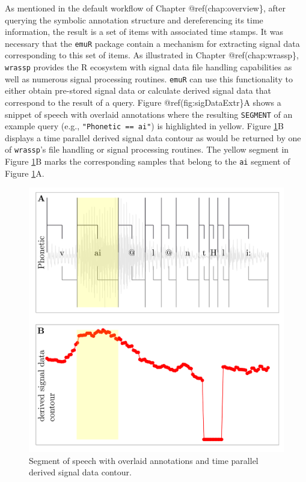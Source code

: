 \documentclass[]{book}
\begin{document}
As mentioned in the default workflow of Chapter @ref(chap:overview\}, after querying the symbolic annotation structure and dereferencing its time information, the result is a set of items with associated time stamps. It was necessary that the \texttt{emuR} package contain a mechanism for extracting signal data corresponding to this set of items. As illustrated in Chapter @ref(chap:wrassp\}, \texttt{wrassp} provides the R ecosystem with signal data file handling capabilities as well as numerous signal processing routines. \texttt{emuR} can use this functionality to either obtain pre-stored signal data or calculate derived signal data that correspond to the result of a query. Figure @ref(fig:sigDataExtr\}A shows a snippet of speech with overlaid annotations where the resulting \texttt{SEGMENT} of an example query (e.g., \texttt{"Phonetic\ ==\ ai"}) is highlighted in yellow. Figure \ref{fig:sigDataExtr}B displays a time parallel derived signal data contour as would be returned by one of \texttt{wrassp}'s file handling or signal processing routines. The yellow segment in Figure \ref{fig:sigDataExtr}B marks the corresponding samples that belong to the \texttt{ai} segment of Figure \ref{fig:sigDataExtr}A.

\begin{figure}

{\centering \includegraphics[width=0.75\linewidth]{pics/sigDataExtr} 

}

\caption{Segment of speech with overlaid annotations and time parallel derived signal data contour.}\label{fig:sigDataExtr}
\end{figure}
\end{document}
